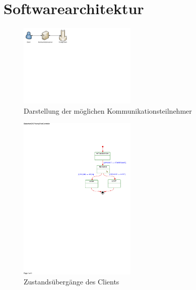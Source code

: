 \section{Softwarearchitektur}
\label{sec:Softwarearchitektur}

\begin{figure}[H]
  \centering
  \includegraphics[trim=0mm 165mm 175mm 0mm,clip,width=0.5\textwidth]{images/Kommunikationsmodell.pdf}
  \caption{Darstellung der möglichen Kommunikationsteilnehmer}
  \label{fig:Kommunikationsteilnehmer}
\end{figure}


\begin{figure}[H]
  \centering
  \includegraphics[trim=105mm 155mm 5mm 42mm,clip,width=0.5\textwidth]{images/SMController.pdf}
  \caption{Zustandsübergänge des Clients}
  \label{fig:Clientstates}
\end{figure}


